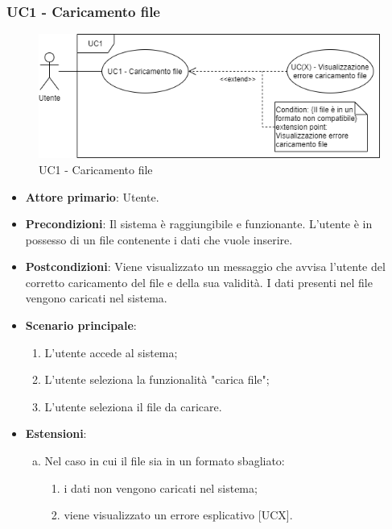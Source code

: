 \subsubsection{UC1 - Caricamento file}
\begin{figure}[h]
\includegraphics[width=\linewidth]{section/Images/UC1CaricamentoFile.png}
\centering
\caption{UC1 - Caricamento file}
\end{figure}
\begin{itemize}
	\item \textbf{Attore primario}: Utente.
	\item \textbf{Precondizioni}: Il sistema è raggiungibile e funzionante. L'utente è in possesso di un file contenente i dati che vuole inserire.
	\item \textbf{Postcondizioni}: Viene visualizzato un messaggio che avvisa l'utente del corretto caricamento del file e della sua validità. I dati presenti nel file vengono caricati nel sistema.
	\item \textbf{Scenario principale}:
		\begin{enumerate}
			\item L'utente accede al sistema;
			\item L'utente seleziona la funzionalità "carica file";
			\item L'utente seleziona il file da caricare.
		\end{enumerate}
	\item \textbf{Estensioni}:
	\begin{enumerate}[(a)]
		\item Nel caso in cui il file sia in un formato sbagliato:
		\begin{enumerate}[1.]
			\item i dati non vengono caricati nel sistema;
			\item viene visualizzato un errore esplicativo [UCX].
		\end{enumerate}
	\end{enumerate}
\end{itemize}